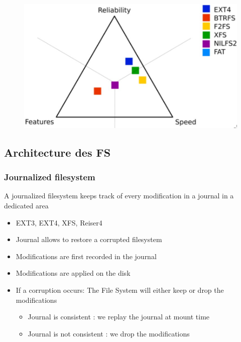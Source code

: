 \documentclass[resume]{subfiles}
\begin{document}
\begin{figure}[H]
    \centering
    \includegraphics[width=1\columnwidth]{Figures/fileSystem/fsComp.PNG}
    \label{fig:fsComp}
\end{figure}

\subsection{Architecture des FS}

\subsubsection{Journalized filesystem}
A journalized filesystem keeps track of every modification in a journal in a dedicated area
\begin{itemize}
    \item EXT3, EXT4, XFS, Reiser4
    \item Journal allows to restore a corrupted filesystem
    \item Modifications are first recorded in the journal
    \item Modifications are applied on the disk
    \item If a corruption occurs: The File System will either keep or drop the
    modifications
    \begin{itemize}
        \item Journal is consistent : we replay the journal at mount time
        \item Journal is not consistent : we drop the modifications
    \end{itemize}
\end{itemize}
\end{document}
